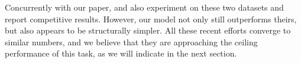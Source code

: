 




Concurrently with our paper,  and  also experiment on these two datasets and report competitive results. However, our model not only still outperforms theirs, but also appears to be structurally simpler. All these recent efforts converge to similar numbers, and we believe that they are approaching the ceiling performance of this task, as we will indicate in the next section.



